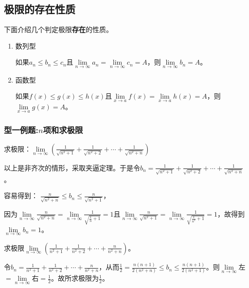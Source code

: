     \subsection{极限的存在性质}
    下面介绍几个判定极限\textbf{存在}的性质。
    \begin{property}
    \begin{enumerate}
        \item 数列型
       
        如果$ a_n\leq b_n\leq c_n $且$ \lim\limits_{n \to \infty}a_n=\lim\limits_{n \to \infty}c_n=A $，则$ \lim\limits_{n \to \infty}b_n=A $。
        \item 函数型
        
        如果$ f(x)\leq g(x)\leq h(x) $且$ \lim\limits_{x \to a}f(x)=\lim\limits_{x \to a}h(x)=A $，则$ \lim\limits_{x \to a}g(x)=A $。
    \end{enumerate}
    \end{property}
    \subsubsection*{型一例题:$n$项和求极限}
    \begin{example}
        求极限：$\lim\limits_{n \to \infty}(\displaystyle\frac{1}{\sqrt{n^2+1}}+\displaystyle\frac{1}{\sqrt{n^2+2}}+ \cdots +\frac{1}{\sqrt{n^2+n}})$
    \end{example}
    \begin{solution}
        以上是非齐次的情形，采取夹逼定理。于是令$b_n=\displaystyle\frac{1}{\sqrt{n^2+1}}+\displaystyle\frac{1}{\sqrt{n^2+2}}+ \cdots +\frac{1}{\sqrt{n^2+n}}$。
        
        容易得到：
        $\displaystyle\frac{n}{\sqrt{n^2+n}}\leq b_n \leq \displaystyle\frac{n}{\sqrt{n^2+1}}$，
        
        因为$\lim\limits_{n \to \infty}\displaystyle\frac{n}{\sqrt{n^2+n}}=\lim\limits_{n\to\infty}\displaystyle\frac{1}{\sqrt{\frac{1}{n}+1}}=1$且$\lim\limits_{n \to \infty}\displaystyle\frac{n}{\sqrt{n^2+1}}=\lim\limits_{n\to\infty}\displaystyle\frac{1}{\sqrt{\frac{1}{n^2}+1}}=1$，故得到$\lim\limits_{n \to \infty}b_n=1$。
    \end{solution}

    \begin{example}
        求极限$ \lim\limits_{n \to \infty}(\displaystyle\frac{1}{n^2+1}+\displaystyle\frac{1}{n^2+2}+\cdots+\displaystyle\frac{n}{n^2+n}) $。
    \end{example}
    \begin{solution}
        令$ b_n=\displaystyle\frac{1}{n^2+1}+\displaystyle\frac{1}{n^2+2}+\cdots+\displaystyle\frac{n}{n^2+n}$，从而$\displaystyle\frac{1}{2}=\displaystyle\frac{n(n+1)}{2(n^2+n)} \leq b_n \leq\displaystyle\frac{n(n+1)}{2(n^2+1)}$。则$\lim\limits_{n \to \infty}$左$=\lim\limits_{n \to \infty}$右$=\displaystyle\frac{1}{2}$。故所求极限为$\displaystyle\frac{1}{2}$。
    \end{solution}


